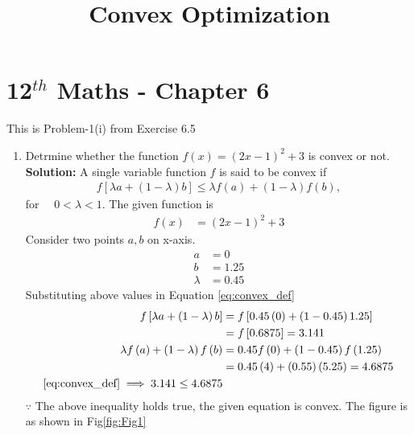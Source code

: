 \documentclass[12pt]{article}
\providecommand{\brak}[1]{\ensuremath{\left(#1\right)}}
\providecommand{\sbrak}[1]{\ensuremath{{}\left[#1\right]}}
\newcommand{\solution}{\noindent \textbf{Solution: }}
\begin{document}
\begin{center}
\title{\textbf{Convex Optimization}}
\date{\vspace{-5ex}} %
\maketitle
\end{center}
\setcounter{page}{1}

\section{12$^{th}$ Maths - Chapter 6}
This is Problem-1(i) from Exercise 6.5
\begin{enumerate}
\item Detrmine whether the function $f\brak{x} = \brak{2x-1}^2 + 3$ is convex or not. \\ 
\solution 
A single variable function $f$ is said to be convex if
\begin{align}
	\label{eq:convex_def}
        f\sbrak{\lambda a + \brak{1-\lambda}b} \leq \lambda f\brak{a} + \brak{1-\lambda}f\brak{b},
\end{align}
for $\quad 0 < \lambda < 1$.
The given function is 
\begin{align}
	\label{eq:givenFunc}
	 f\brak{x} &= \brak{2x-1}^2 + 3
\end{align}
Consider two points $a, b$ on x-axis. 
\begin{align}
	a &= 0 \\
	b &= 1.25 \\
	\lambda &= 0.45
\end{align}
Substituting above values in Equation \eqref {eq:convex_def}
\begin{align}
        f\sbrak{\lambda a + \brak{1-\lambda}b} &= f\sbrak{0.45\brak{0} + \brak{1-0.45}1.25} \\ 
	\label{eq:Inequality1}
	&= f\sbrak{0.6875} = 3.141 \\
	\lambda f\brak{a} + \brak{1-\lambda}f\brak{b} &=  0.45f\brak{0} + \brak{1-0.45}f\brak{1.25} \\
	\label{eq:Inequality2}
	&=  0.45\brak{4} + \brak{0.55}\brak{5.25}  = 4.6875\\
	\eqref{eq:convex_def} \implies 3.141 \leq 4.6875 
\end{align}
$\because$ The above inequality holds true, the given equation is convex.
The figure is as shown in Fig\ref{fig:Fig1}
\begin{figure}[!h]
	\begin{center}

\end{center}
\end{figure}
\end{enumerate}
\end{document}
